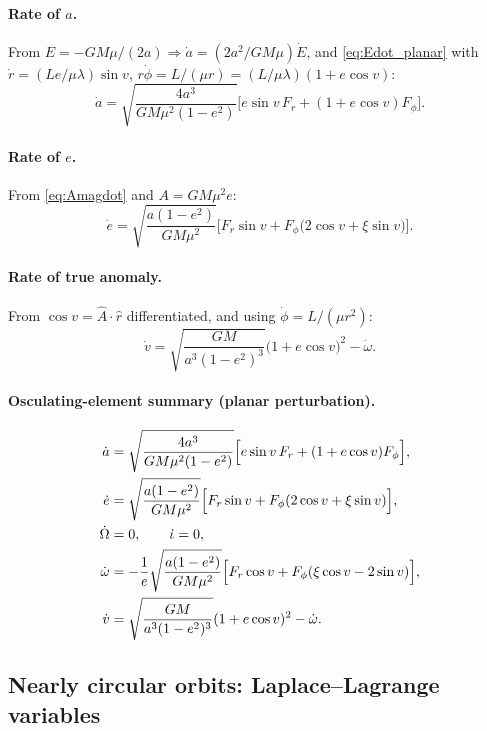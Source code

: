 \documentclass[11pt]{article}
\newcommand{\rhat}{\hat r}
\begin{document}
\paragraph{Rate of $a$.} From $E=-GM\mu/(2a)\Rightarrow\dot a = (2a^2/GM\mu)\dot E$, and \eqref{eq:Edot_planar} with $\dot r = (Le/\mu\lambda)\sin v$, $r\dot\phi = L/(\mu r)=(L/\mu\lambda)(1+e\cos v)$:
\begin{equation}
\dot a = \sqrt{\frac{4a^3}{GM\mu^2(1-e^2)}}\Big[e\sin v\,F_r + (1+e\cos v)F_\phi\Big]. \label{eq:adot}
\end{equation}
\paragraph{Rate of $e$.} From \eqref{eq:Amagdot} and $A=GM\mu^2e$:
\begin{equation}
\dot e = \sqrt{\frac{a(1-e^2)}{GM\mu^2}}\Big[F_r\sin v + F_\phi\big(2\cos v+\xi\sin v\big)\Big]. \label{eq:edot}
\end{equation}

\paragraph{Rate of true anomaly.} From $\cos v = \hat A\cdot\rhat$ differentiated, and using $\dot\phi=L/(\mu r^2)$:
\begin{equation}
\dot v = \sqrt{\frac{GM}{a^3(1-e^2)^3}}\big(1+e\cos v\big)^2 - \dot\omega. \label{eq:vdot}
\end{equation}

\paragraph{Osculating-element summary (planar perturbation).}
\begin{align}
\dot a &= \sqrt{\frac{4a^3}{GM\mu^2(1-e^2)}}\Big[e\sin v\,F_r+(1+e\cos v)F_\phi\Big], \notag\\
\dot e &= \sqrt{\frac{a(1-e^2)}{GM\mu^2}}\Big[F_r\sin v+F_\phi(2\cos v+\xi\sin v)\Big], \notag\\
\dot\Omega &= 0,\qquad \dot\iota=0, \notag\\
\dot\omega &= -\frac1e\sqrt{\frac{a(1-e^2)}{GM\mu^2}}\Big[F_r\cos v + F_\phi(\xi\cos v-2\sin v)\Big], \notag\\
\dot v &= \sqrt{\frac{GM}{a^3(1-e^2)^3}}(1+e\cos v)^2 - \dot\omega. \notag
\end{align}

\subsection{Nearly circular orbits: Laplace--Lagrange variables}
\end{document}
